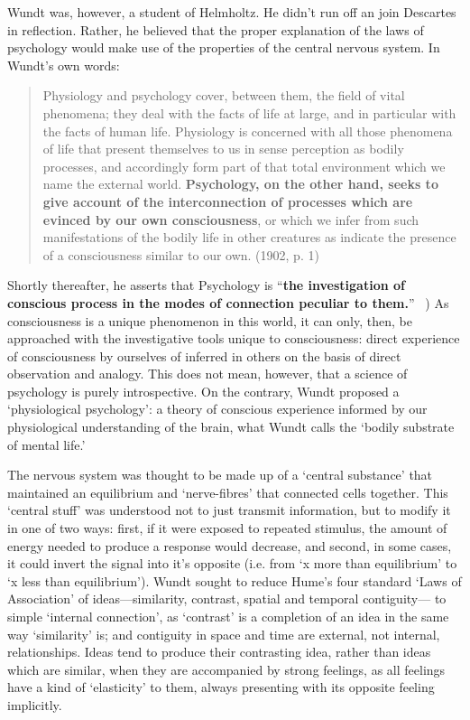 \begin{refsection}
Wundt was, however, a student of Helmholtz. He didn’t run off an join Descartes in reflection. Rather, he believed that the proper explanation of the laws of psychology would make use of the properties of the central nervous system. In Wundt's own words:

\begin{quote}

Physiology and psychology cover, between them, the field of vital phenomena; they deal with the facts of life at large, and in particular with the facts of human life. Physiology is concerned with all those phenomena of life that present themselves to us in sense perception as bodily processes, and accordingly form part of that total environment which we name the external world. \textbf{Psychology, on the other hand, seeks to give account of the interconnection of processes which are evinced by our own consciousness}, or which we infer from such manifestations of the bodily life in other creatures as indicate the presence of a consciousness similar to our own. (1902, p. 1)
\end{quote}

Shortly thereafter, he asserts that Psychology is “\textbf{the investigation of conscious process in the modes of connection peculiar to them.}” ~\citep[p. 2]{Wundt:1902vf}) As consciousness is a unique phenomenon in this world, it can only, then, be approached with the investigative tools unique to consciousness: direct experience of consciousness by ourselves of inferred in others on the basis of direct observation and analogy. This does not mean, however, that a science of psychology is purely introspective. On the contrary, Wundt proposed a `physiological psychology': a theory of conscious experience informed by our physiological understanding of the brain, what Wundt calls the `bodily substrate of mental life.'

The nervous system was thought to be made up of a `central substance' that maintained an equilibrium and `nerve-fibres' that connected cells together. This `central stuff' was understood not to just transmit information, but to modify it in one of two ways: first, if it were exposed to repeated stimulus, the amount of energy needed to produce a response would decrease, and second, in some cases, it could invert the signal into it's opposite (i.e. from `x more than equilibrium' to `x less than equilibrium'). Wundt sought to reduce Hume’s four standard `Laws of Association' of ideas—similarity, contrast, spatial and temporal contiguity— to simple `internal connection', as `contrast' is a completion of an idea in the same way `similarity' is; and contiguity in space and time are external, not internal, relationships. Ideas tend to produce their contrasting idea, rather than ideas which are similar, when they are accompanied by strong feelings, as all feelings have a kind of `elasticity' to them, always presenting with its opposite feeling implicitly.


\end{refsection}
